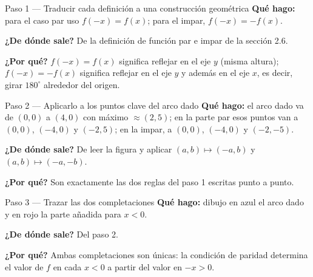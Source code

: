 \documentclass[11pt]{article}
\begin{document}
\begin{paso}{Paso 1 --- Traducir cada definición a una construcción geométrica}
\textbf{Qué hago:} para el caso par uso $f(-x)=f(x)$; para el impar, $f(-x)=-f(x)$.

\textbf{¿De dónde sale?} De la definición de función par e impar de la sección 2.6.

\textbf{¿Por qué?} $f(-x)=f(x)$ significa reflejar en el eje $y$ (misma altura); $f(-x)=-f(x)$ significa reflejar en el eje $y$ y además en el eje $x$, es decir, girar $180^\circ$ alrededor del origen.
\end{paso}

\begin{paso}{Paso 2 --- Aplicarlo a los puntos clave del arco dado}
\textbf{Qué hago:} el arco dado va de $(0,0)$ a $(4,0)$ con máximo $\approx(2,5)$; en la parte par esos puntos van a $(0,0)$, $(-4,0)$ y $(-2,5)$; en la impar, a $(0,0)$, $(-4,0)$ y $(-2,-5)$.

\textbf{¿De dónde sale?} De leer la figura y aplicar $(a,b)\mapsto(-a,b)$ y $(a,b)\mapsto(-a,-b)$.

\textbf{¿Por qué?} Son exactamente las dos reglas del paso 1 escritas punto a punto.
\end{paso}

\begin{paso}{Paso 3 --- Trazar las dos completaciones}
\textbf{Qué hago:} dibujo en azul el arco dado y en rojo la parte añadida para $x<0$.

\textbf{¿De dónde sale?} Del paso 2.

\textbf{¿Por qué?} Ambas completaciones son únicas: la condición de paridad determina el valor de $f$ en cada $x<0$ a partir del valor en $-x>0$.

\begin{center}
\end{center}
\end{paso}
\end{document}
